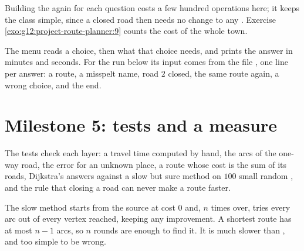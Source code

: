 Building the  again for each question costs a few hundred operations here; it keeps the class simple, since a
closed road then needs no change to any . Exercise \ref{exo:g12:project-route-planner:9} counts the cost of the
whole town.

The menu reads a choice, then what that choice needs, and prints the answer in minutes and seconds. For the run below
its input comes from the file , one line per answer: a route, a misspelt name, road $2$ closed, the
same route again, a wrong choice, and the end.

\label{lst:g12:project-route-planner:menu}

\label{out:g12:project-route-planner:menu}

\section{Milestone 5: tests and a measure}\label{sec:g12:project-route-planner:m5}

The tests check each layer: a travel time computed by hand, the arcs of the one-way road, the error for an unknown
place, a route whose cost is the sum of its roads, Dijkstra's answers against a slow but sure method on $100$ small
random , and the rule that closing a road can never make a route faster.

\label{lst:g12:project-route-planner:tests-a}

The slow method starts from the source at cost $0$ and, $n$ times over, tries every arc out of every vertex reached,
keeping any improvement. A shortest route has at most $n - 1$ arcs, so $n$ rounds are enough to find it. It is
much slower than , and too simple to be wrong.

\label{lst:g12:project-route-planner:tests-b}


